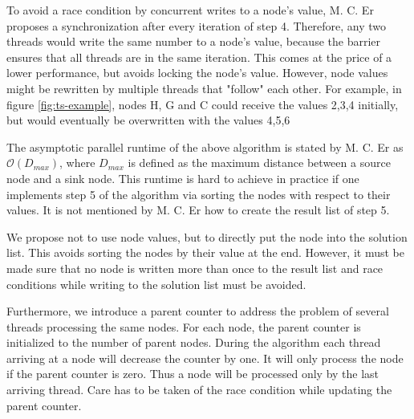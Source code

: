 To avoid a race condition by concurrent writes to a node’s value, M. C. Er proposes a synchronization after every iteration of step 4. Therefore, any two threads would write the same number to a node’s value, because the barrier ensures that all threads are in the same iteration. This comes at the price of a lower performance, but avoids locking the node's value. However, node values might be rewritten by multiple threads that "follow" each other. For example, in figure \ref{fig:ts-example}, nodes H, G and C could receive the values 2,3,4 initially, but would eventually be overwritten with the values 4,5,6

The asymptotic parallel runtime of the above algorithm is stated by M. C. Er as $\mathcal{O}(D_{max})$, where $D_{max}$ is defined as the maximum distance between a source node and a sink node. This runtime is hard to achieve in practice if one implements step 5 of the algorithm via sorting the nodes with respect to their values. It is not mentioned by M. C. Er how to create the result list of step 5.

We propose not to use node values, but to directly put the node into the solution list. This avoids sorting the nodes by their value at the end. However, it must be made sure that no node is written more than once to the result list and race conditions while writing to the solution list must be avoided.

Furthermore, we introduce a parent counter to address the problem of several threads processing the same nodes. For each node, the parent counter is initialized to the number of parent nodes. During the algorithm each thread arriving at a node will decrease the counter by one. It will only process the node if the parent counter is zero. Thus a node will be processed only by the last arriving thread. Care has to be taken of the race condition while updating the parent counter.



 
 
